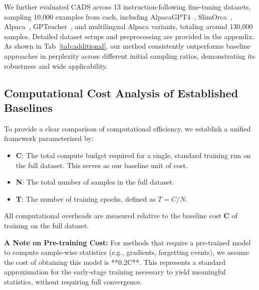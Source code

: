 We further evaluated CADS across 13 instruction-following fine-tuning datasets, sampling 10,000 examples from each, including AlpacaGPT4~\cite{alpaca-gpt4}, SlimOrca~\cite{slimorca}, Alpaca~\cite{alpaca}, GPTeacher~\cite{gpteacher}, and multilingual Alpaca variants, totaling around 130,000 samples. Detailed dataset setups and preprocessing are provided in the appendix.  
As shown in Tab~\ref{tab:additional}, our method consistently outperforms baseline approaches in perplexity across different initial sampling ratios, demonstrating its robustness and wide applicability.  

\subsection{Computational Cost Analysis of Established Baselines}

To provide a clear comparison of computational efficiency, we establish a unified framework parameterized by: 
\begin{itemize}
    \item \textbf{C}: The total compute budget required for a single, standard training run on the full dataset. This serves as our baseline unit of cost.
    \item \textbf{N}: The total number of samples in the full dataset.
    \item \textbf{T}: The number of training epochs, defined as $T = C/N$.
\end{itemize}
All computational overheads are measured relative to the baseline cost \textbf{C} of training on the full dataset.

\textbf{A Note on Pre-training Cost:} For methods that require a pre-trained model to compute sample-wise statistics (e.g., gradients, forgetting events), we assume the cost of obtaining this model is **0.2C**. This represents a standard approximation for the early-stage training necessary to yield meaningful statistics, without requiring full convergence.

